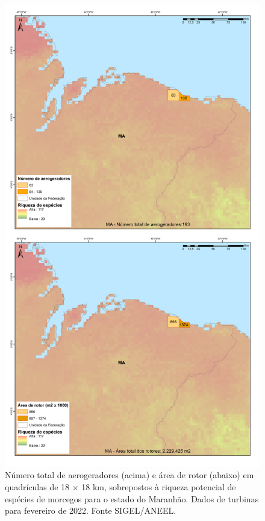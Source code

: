 \documentclass[
  oneside]{scrbook}
\begin{document}
\begin{figure}[H]

{\centering \includegraphics[width=0.75\linewidth]{imagens/cap09/Figura_9.5} 

}

\caption{Número total de aerogeradores (acima) e área de rotor (abaixo) em quadrículas de 18 × 18 km, sobrepostos à riqueza potencial de espécies de morcegos para o estado do Maranhão. Dados de turbinas para fevereiro de 2022. Fonte SIGEL/ANEEL.}\label{fig:70}
\end{figure}
\end{document}
